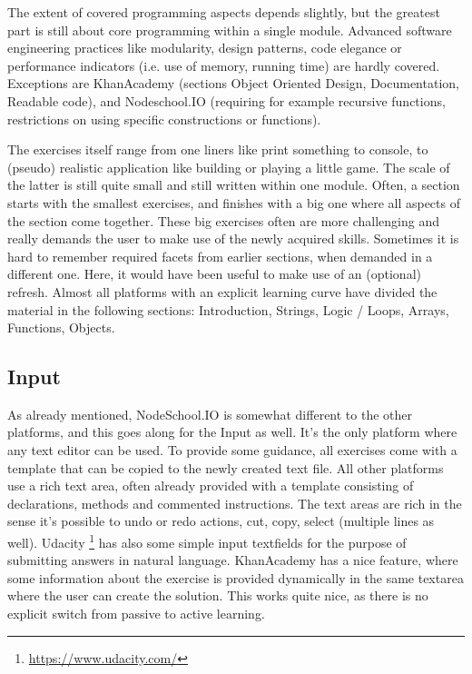 \documentclass{article}
\begin{document}
The extent of covered programming aspects depends slightly, but the greatest 
part is still about core programming within a single module. Advanced software
engineering practices like modularity, design patterns, code elegance or 
performance indicators (i.e. use of memory, running time) are hardly covered. 
Exceptions are KhanAcademy (sections Object Oriented Design, Documentation, 
Readable code), and Nodeschool.IO (requiring for example recursive functions, 
restrictions on using specific constructions or functions).


The exercises itself range from one liners like print something to console, to
(pseudo) realistic application like building or playing a little game. 
The scale of the latter is still quite small and still written within one module.
Often, a section starts with the smallest exercises, and finishes with a big 
one where all aspects of the section come together. These big exercises often 
are more challenging and really demands the user to make use of the newly 
acquired skills. Sometimes it is hard to remember required facets from earlier
sections, when demanded in a different one. Here, it would have been useful to 
make use of an (optional) refresh. Almost all platforms with an explicit
learning curve have divided the 
material in the following sections: Introduction, Strings, Logic / Loops, 
Arrays, Functions, Objects. 

\subsection{Input}
As already mentioned, NodeSchool.IO is somewhat different to the other
platforms, and this goes along for the Input as well. It's the only platform
where any
text editor can be used. To provide some guidance, all exercises come with a 
template that can be copied to the newly created text file. All other platforms
use a rich text area, often already provided with a template consisting of 
declarations, methods and commented instructions. The text areas are rich in the
sense it's possible to undo or redo actions, cut, copy, select (multiple lines 
as well). Udacity
\footnote{\url{https://www.udacity.com/}} has also some simple input textfields
for the purpose of submitting answers in natural language. KhanAcademy has a
nice feature, where some information about the exercise is provided dynamically
in the same textarea where the user can create the solution. This works quite
nice, as there is no explicit switch from passive to active learning.
\end{document}

